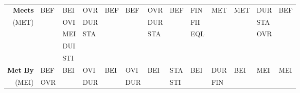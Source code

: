 \documentclass[11pt]{report}
\newenvironment{vvarmargin}[2]
{
  \begin{list}{}
  {
    \setlength{\topsep}{0pt}
    \setlength{\leftmargin}{0pt}
    \setlength{\rightmargin}{0pt}
    \setlength{\listparindent}{\parindent}
    \setlength{\itemindent}{\parindent}
    \setlength{\parsep}{0pt plus 1pt}
    \addtolength{\leftmargin}{#1}\addtolength{\rightmargin}{#2}
  }
  \item
}
{
  \end{list}
}
\begin{document}
\begin{table}[p]
\begin{vvarmargin}{-4cm}{-4cm}
\begin{center}
\begin{tabular}[t]{|r|l|l|l|l|l|l|l|l|l|l|l|l|}
                \hline
                \textbf{Meets}          & BEF                     & BEI                     & OVR                     & BEF                     & BEF                     & OVR                     & BEF                     & FIN                     & MET                     & MET                     & DUR                     & BEF                     \\  
                (MET)                   &                         & OVI                     & DUR                     &                         &                         & DUR                     &                         & FII                     &                         &                         & STA                     &                         \\
                                        &                         & MEI                     & STA                     &                         &                         & STA                     &                         & EQL                     &                         &                         & OVR                     &                         \\
                                        &                         & DUI                     &                         &                         &                         &                         &                         &                         &                         &                         &                         &                         \\
                                        &                         & STI                     &                         &                         &                         &                         &                         &                         &                         &                         &                         &                         \\
                \hline
                \textbf{Met By}         & BEF                     & BEI                     & OVI                     & BEI                     & OVI                     & BEI                     & STA                     & BEI                     & DUR                     & BEI                     & MEI                     & MEI                     \\
                (MEI)                   & OVR                     &                         & DUR                     &                         & DUR                     &                         & STI                     &                         & FIN                     &                         &                         &                         \\

\end{tabular}
\end{center}
\end{vvarmargin}
\end{table}
\end{document}
